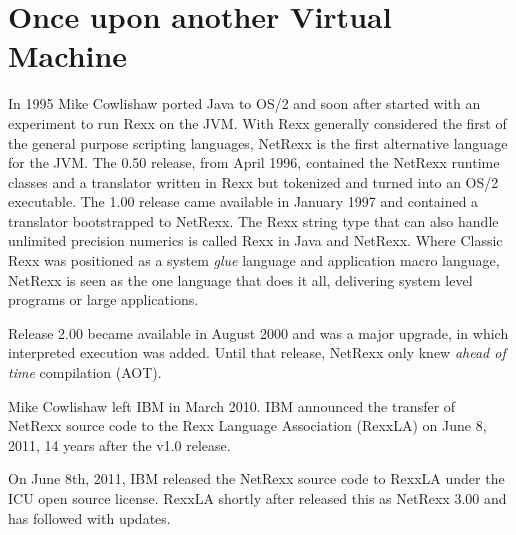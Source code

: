 \documentclass[10pt]{book}
\begin{document}
\section{Once upon another Virtual Machine}
In 1995 Mike Cowlishaw ported Java\textsuperscript{\texttrademark} to OS/2\textsuperscript{\texttrademark} and soon after started with
an experiment to run Rexx on the JVM\textsuperscript{\texttrademark}. With Rexx generally considered
the first of the general purpose scripting languages, NetRexx\textsuperscript{\texttrademark}  is the
first alternative language for the JVM. The 0.50 release, from April
1996, contained the NetRexx runtime classes and a translator written
in Rexx but tokenized and turned into an OS/2 executable. The 1.00
release came available in January 1997 and contained a translator
bootstrapped to NetRexx. The Rexx string type that can also handle
unlimited precision numerics is called Rexx in Java and NetRexx.
Where Classic Rexx was positioned as a system \emph{glue} language and
application macro language, NetRexx is seen as the one language that
does it all, delivering system level programs or large applications.

Release 2.00 became available in August 2000 and was a major upgrade,
in which interpreted execution was added. Until that release, NetRexx
only knew \emph{ahead of time} compilation (AOT).

Mike Cowlishaw left IBM in March 2010. IBM announced the transfer of NetRexx source code to the Rexx Language Association (RexxLA) on June 8, 2011, 14 years after the v1.0 release.

On June 8th, 2011, IBM released the NetRexx source code to RexxLA
under the ICU open source license. RexxLA shortly after released this
as NetRexx 3.00 and has followed with updates.
\end{document}
